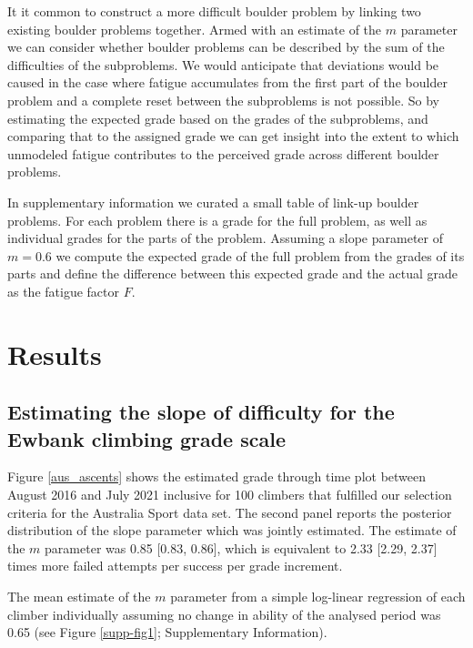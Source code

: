 \documentclass{article}
\begin{document}
It it common to construct a more difficult boulder problem by linking two existing boulder problems together. Armed with an estimate of the $m$ parameter we can consider whether boulder problems can be described by the sum of the difficulties of the subproblems. We would anticipate that deviations would be caused in the case where fatigue accumulates from the first part of the boulder problem and a complete reset between the subproblems is not possible. So by estimating the expected grade based on the grades of the subproblems, and comparing that to the assigned grade we can get insight into the extent to which unmodeled fatigue contributes to the perceived grade across different boulder problems.

In supplementary information we curated a small table of link-up boulder problems. For each problem there is a grade for the full problem, as well as individual grades for the parts of the problem. Assuming a slope parameter of $m=0.6$ we compute the expected grade of the full problem from the grades of its parts and define the difference between this expected grade and the actual grade as the fatigue factor $F$.

\section*{Results}

\subsection*{Estimating the slope of difficulty for the Ewbank climbing grade scale}


Figure \ref{aus_ascents} shows the estimated grade through time plot between August 2016 and July 2021 inclusive for 100 climbers that fulfilled our selection criteria for the Australia Sport data set. The second panel reports the posterior distribution of the slope parameter which was jointly estimated.
The estimate of the $m$ parameter was 0.85 [0.83, 0.86], which is equivalent to 2.33 [2.29, 2.37] times more failed attempts per success per grade increment. 

The mean estimate of the $m$ parameter from a simple log-linear regression of each climber individually assuming no change in ability of the analysed period was 0.65 (see Figure \ref{supp-fig1}; Supplementary Information). 
\end{document}
